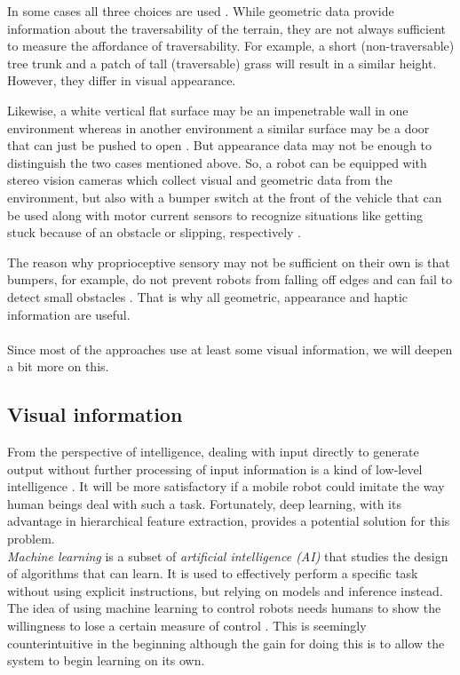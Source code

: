 \documentclass[12pt,a4paper,table,dvipsnames,tikz]{report}
\newcommand{\term}{\textit}
\newcommand{\acronym}{\MakeUppercase}
\begin{document}
	In some cases all three choices are used \citep{Kim, Shneier}. While geometric 
	data provide information about the traversability of the terrain, they are 
	not always sufficient to measure the affordance of traversability. For 
	example, a short (non-traversable) tree trunk and a patch of tall (traversable) 
	grass will result in a similar height. However, they differ in visual 
	appearance. 
	\par 
	Likewise, a white vertical flat surface may be an impenetrable wall in one 
	environment whereas in another environment a similar surface may be a door that 
	can just be pushed to open \citep{Ugur}. But appearance data may not be enough 
	to distinguish the two cases mentioned above. So, a robot can be equipped with 
	stereo vision cameras which collect visual and geometric data from the 
	environment, but also with a bumper switch at the front of the vehicle that can 
	be used along with motor current sensors to recognize situations like getting 
	stuck because of an obstacle or slipping, respectively \citep{Kim}.
	\par
	The reason why proprioceptive sensory may not be sufficient on their own is that 
	bumpers, for example, do not prevent robots from falling off edges and can fail 
	to detect small obstacles \citep{HiroseGonet}. That is why all geometric, 
	appearance and haptic information are useful.
	\\\\
	
	
	Since most of the approaches use at least some visual information, we will 
	deepen a bit more on this.
	\\
	
	\subsection{Visual information}
	\label{sec:bg:data:neural}
	
	From the perspective of intelligence, dealing with input directly to generate 
	output without further processing of input information is a kind of	low-level 
	intelligence \citep{Tai}. It will be more satisfactory if a mobile robot could 
	imitate the way human beings deal with such a task. Fortunately, deep learning, 
	with its advantage in hierarchical feature extraction, provides a potential 
	solution for this problem.
	\\
	
	\term{Machine learning} is a subset of \term{artificial intelligence (\acronym{ai})} 
	that studies the design of algorithms that can learn. It is used to effectively 
	perform a specific task without using explicit instructions, but relying on 
	models and inference instead. The idea of using machine learning to control 
	robots needs humans to show the willingness to lose a certain measure of control 
	\citep{Shabbir}. This is seemingly counterintuitive in the beginning although the 
	gain for doing this is to allow the system to begin learning on its own.
	\\
	
\end{document}

